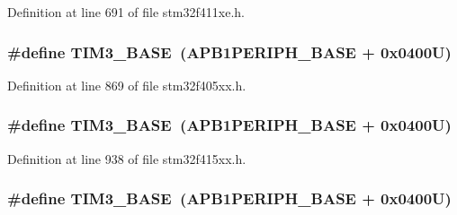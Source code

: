 Definition at line 691 of file stm32f411xe.\+h.

\subsubsection[{\texorpdfstring{T\+I\+M3\+\_\+\+B\+A\+SE}{TIM3_BASE}}]{\setlength{\rightskip}{0pt plus 5cm}\#define T\+I\+M3\+\_\+\+B\+A\+SE~({\bf A\+P\+B1\+P\+E\+R\+I\+P\+H\+\_\+\+B\+A\+SE} + 0x0400\+U)}\hypertarget{group___peripheral__registers__structures_gaf0c34a518f87e1e505cd2332e989564a}{}\label{group___peripheral__registers__structures_gaf0c34a518f87e1e505cd2332e989564a}


Definition at line 869 of file stm32f405xx.\+h.

\subsubsection[{\texorpdfstring{T\+I\+M3\+\_\+\+B\+A\+SE}{TIM3_BASE}}]{\setlength{\rightskip}{0pt plus 5cm}\#define T\+I\+M3\+\_\+\+B\+A\+SE~({\bf A\+P\+B1\+P\+E\+R\+I\+P\+H\+\_\+\+B\+A\+SE} + 0x0400\+U)}\hypertarget{group___peripheral__registers__structures_gaf0c34a518f87e1e505cd2332e989564a}{}\label{group___peripheral__registers__structures_gaf0c34a518f87e1e505cd2332e989564a}


Definition at line 938 of file stm32f415xx.\+h.

\subsubsection[{\texorpdfstring{T\+I\+M3\+\_\+\+B\+A\+SE}{TIM3_BASE}}]{\setlength{\rightskip}{0pt plus 5cm}\#define T\+I\+M3\+\_\+\+B\+A\+SE~({\bf A\+P\+B1\+P\+E\+R\+I\+P\+H\+\_\+\+B\+A\+SE} + 0x0400\+U)}\hypertarget{group___peripheral__registers__structures_gaf0c34a518f87e1e505cd2332e989564a}{}\label{group___peripheral__registers__structures_gaf0c34a518f87e1e505cd2332e989564a}


